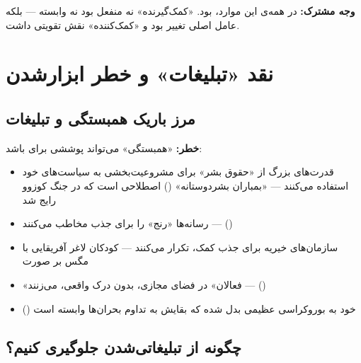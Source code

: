 \textbf{وجه مشترک:} در همه‌ی این موارد،  بود. «کمک‌گیرنده» نه منفعل
بود نه وابسته — بلکه عامل اصلی تغییر بود و «کمک‌کننده» نقش تقویتی داشت.


\section{نقد «تبلیغات» و خطر ابزارشدن}
\label{sec:ch17-propaganda-critique}

\subsection{مرز باریک همبستگی و تبلیغات}

\begin{tcolorbox}[enemybox, title={خطر ابزاری‌شدن همبستگی}]
\textbf{خطر:} «همبستگی» می‌تواند پوششی برای  باشد:

\begin{itemize}
\item قدرت‌های بزرگ از «حقوق بشر» برای مشروعیت‌بخشی به سیاست‌های خود
  استفاده می‌کنند — «بمباران بشردوستانه» ()
  اصطلاحی است که در جنگ کوزوو رایج شد
\item رسانه‌ها «رنج» را برای جذب مخاطب  می‌کنند —
   ()
\item سازمان‌های خیریه برای جذب کمک،  تکرار
  می‌کنند — کودکان لاغر آفریقایی با مگس بر صورت
\item «فعالان» در فضای مجازی، بدون درک واقعی،
   می‌زنند — 
  ()
\item {} () خود به بوروکراسی
  عظیمی بدل شده که بقایش به تداوم بحران‌ها وابسته است
\end{itemize}
\end{tcolorbox}


\subsection{چگونه از تبلیغاتی‌شدن جلوگیری کنیم؟}

